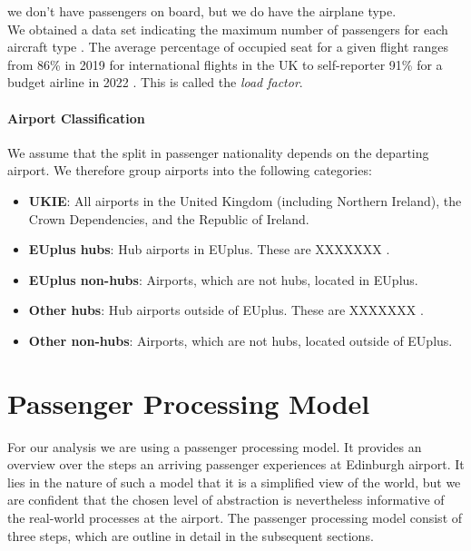 \documentclass[10pt]{article}
\begin{document}
we don't have passengers on board, but we do have the airplane type. \\
We obtained a data set indicating the maximum number of passengers for each aircraft type \cite{aircraft_capacity}. The average percentage of occupied seat for a given flight ranges from 86\% in 2019 for international flights in the UK \cite{loading_factor_national} to self-reporter 91\% for a budget airline in 2022 \cite{loading_factor_ryanair}. This is called the \textit{load factor}.

\paragraph{Airport Classification}
We assume that the split in passenger nationality depends on the departing airport. We therefore group airports into the following categories: 
\begin{itemize}
    \item \textbf{UKIE}: All airports in the United Kingdom (including Northern Ireland), the Crown Dependencies, and the Republic of Ireland.
    \item \textbf{EUplus hubs}: Hub airports in EUplus. These are XXXXXXX \cite{mega_hubs}.
    \item \textbf{EUplus non-hubs}: Airports, which are not hubs, located in EUplus.
    \item \textbf{Other hubs}: Hub airports outside of EUplus. These are XXXXXXX \cite{mega_hubs}.
    \item \textbf{Other non-hubs}: Airports, which are not hubs, located outside of EUplus.
\end{itemize}




\section{Passenger Processing Model}

For our analysis we are using a passenger processing model. It provides an overview over the steps an arriving passenger experiences at Edinburgh airport. It lies in the nature of such a model that it is a simplified view of the world, but we are confident that the chosen level of abstraction is nevertheless informative of the real-world processes at the airport. The passenger processing model consist of three steps, which are outline in detail in the subsequent sections.
\end{document}
